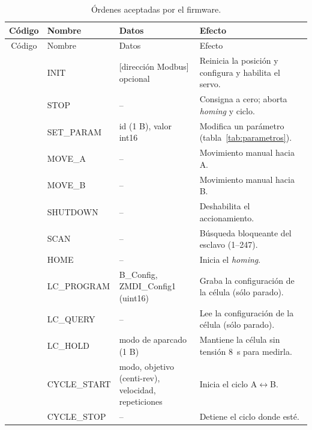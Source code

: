 \begin{longtable}{@{}clL{0.30\textwidth}L{0.33\textwidth}@{}}
\caption{Órdenes aceptadas por el firmware.}\label{tab:ordenes}\\
\toprule
Código & Nombre & Datos & Efecto \\
\midrule
\endfirsthead
\toprule
Código & Nombre & Datos & Efecto \\
\midrule
\endhead
{} & INIT & [dirección Modbus] opcional & Reinicia la posición y configura y habilita el servo. \\
 & STOP & -- & Consigna a cero; aborta \emph{homing} y ciclo. \\
 & SET\_PARAM & id (1 B), valor int16 & Modifica un parámetro (tabla~\ref{tab:parametros}). \\
 & MOVE\_A & -- & Movimiento manual hacia A. \\
 & MOVE\_B & -- & Movimiento manual hacia B. \\
 & SHUTDOWN & -- & Deshabilita el accionamiento. \\
 & SCAN & -- & Búsqueda bloqueante del esclavo (1--247). \\
 & HOME & -- & Inicia el \emph{homing}. \\
 & LC\_PROGRAM & B\_Config, ZMDI\_Config1 (uint16) & Graba la configuración de la célula (sólo parado). \\
 & LC\_QUERY & -- & Lee la configuración de la célula (sólo parado). \\
 & LC\_HOLD & modo de aparcado (1 B) & Mantiene la célula sin tensión \SI{8}{\second} para medirla. \\
 & CYCLE\_START & modo, objetivo (centi-rev), velocidad, repeticiones & Inicia el ciclo A$\leftrightarrow$B. \\
 & CYCLE\_STOP & -- & Detiene el ciclo donde esté. \\
\bottomrule
\end{longtable}

